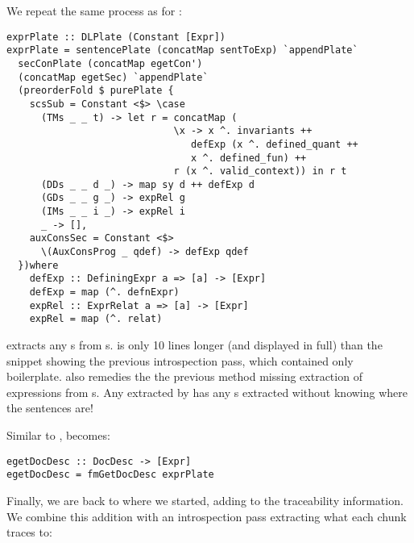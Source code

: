 We repeat the same process as  for :

\begin{tcolorbox}[breakable, toprule at break=0pt, bottomrule at break=0pt]
\begin{verbatim}
exprPlate :: DLPlate (Constant [Expr])
exprPlate = sentencePlate (concatMap sentToExp) `appendPlate`
  secConPlate (concatMap egetCon')
  (concatMap egetSec) `appendPlate`
  (preorderFold $ purePlate {
    scsSub = Constant <$> \case
      (TMs _ _ t) -> let r = concatMap (
                             \x -> x ^. invariants ++
                                defExp (x ^. defined_quant ++
                                x ^. defined_fun) ++
                             r (x ^. valid_context)) in r t
      (DDs _ _ d _) -> map sy d ++ defExp d
      (GDs _ _ g _) -> expRel g
      (IMs _ _ i _) -> expRel i
      _ -> [],
    auxConsSec = Constant <$>
      \(AuxConsProg _ qdef) -> defExp qdef
  })where
    defExp :: DefiningExpr a => [a] -> [Expr]
    defExp = map (^. defnExpr)
    expRel :: ExprRelat a => [a] -> [Expr]
    expRel = map (^. relat)
\end{verbatim}
\end{tcolorbox}

 extracts any s from s.  is only 10 lines longer (and displayed in full) than the snippet showing the previous  introspection pass, which contained only boilerplate.  also remedies the the previous method missing extraction of expressions from s. Any  extracted by  has any s extracted without knowing where the sentences are! 

Similar to ,  becomes:

\begin{tcolorbox}
\begin{verbatim}
egetDocDesc :: DocDesc -> [Expr]
egetDocDesc = fmGetDocDesc exprPlate
\end{verbatim}
\end{tcolorbox}

Finally, we are back to where we started, adding  to the traceability information. We combine this addition with an introspection pass extracting what each chunk traces to:

